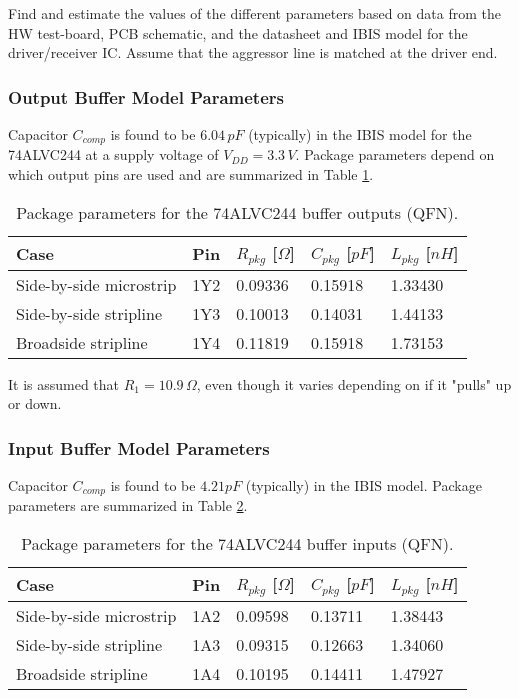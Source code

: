\documentclass[../main.tex]{subfiles}
\begin{document}
Find and estimate the values of the different parameters based on data from the HW test-board, PCB schematic, and the datasheet and IBIS model for the driver/receiver IC. Assume that the aggressor line is matched at the driver end.

\solution

\subsubsection{Output Buffer Model Parameters}

Capacitor $C_{comp}$ is found to be $6.04\,\si{pF}$ (typically) in the IBIS model for the 74ALVC244 at a supply voltage of $V_{DD} = 3.3\,\si{V}$. Package parameters depend on which output pins are used and are summarized in Table \ref{tab:pkg-params}.

\begin{table}[h]
    \centering
    \begin{tabular}{l|l l l l}
        \toprule[1pt]
        \textbf{Case} & \textbf{Pin} & $R_{pkg}$ [$\si{\Omega}$] & $C_{pkg}$ [$\si{pF}$] & $L_{pkg}$ [$\si{nH}$] \\
        \midrule
        Side-by-side microstrip & 1Y2 & 0.09336 & 0.15918 & 1.33430 \\
        Side-by-side stripline  & 1Y3 & 0.10013 & 0.14031 & 1.44133 \\
        Broadside stripline     & 1Y4 & 0.11819 & 0.15918 & 1.73153 \\
        \bottomrule[1pt]
    \end{tabular}
    \caption{Package parameters for the 74ALVC244 buffer outputs (QFN).}
    \label{tab:pkg-params}
\end{table}

It is assumed that $R_1 = 10.9\,\si{\Omega}$, even though it varies depending on if it "pulls" up or down.

\subsubsection{Input Buffer Model Parameters}

Capacitor $C_{comp}$ is found to be $4.21\si{pF}$ (typically) in the IBIS model. Package parameters are summarized in Table \ref{tab:pkg-params2}.

\begin{table}[h]
    \centering
    \begin{tabular}{l|l l l l}
        \toprule[1pt]
        \textbf{Case} & \textbf{Pin} & $R_{pkg}$ [$\si{\Omega}$] & $C_{pkg}$ [$\si{pF}$] & $L_{pkg}$ [$\si{nH}$] \\
        \midrule
        Side-by-side microstrip & 1A2 & 0.09598 & 0.13711 & 1.38443 \\
        Side-by-side stripline  & 1A3 & 0.09315 & 0.12663 & 1.34060 \\
        Broadside stripline     & 1A4 & 0.10195 & 0.14411 & 1.47927 \\
        \bottomrule[1pt]
    \end{tabular}
    \caption{Package parameters for the 74ALVC244 buffer inputs (QFN).}
    \label{tab:pkg-params2}
\end{table}
\end{document}
